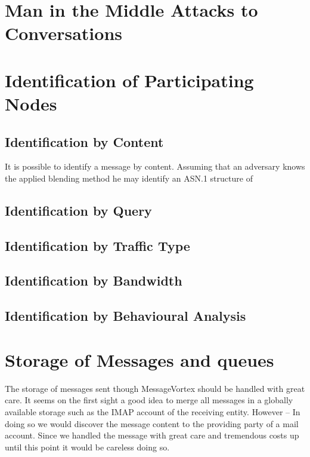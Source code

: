 \section{Man in the Middle Attacks to Conversations}


\section{Identification of Participating Nodes}


\subsection{Identification by Content}
It is possible to identify a message by content. Assuming that an adversary knows the applied blending method he may identify an ASN.1 structure of 


\subsection{Identification by Query}


\subsection{Identification by Traffic Type}


\subsection{Identification by Bandwidth}


\subsection{Identification by Behavioural Analysis}


\section{Storage of Messages and queues}
The storage of messages sent though MessageVortex should be handled with great care. It seems on the first sight a good idea to merge all messages in a globally available storage such as the IMAP account of the receiving entity. However -- In doing so we would discover the message content to the providing party of a mail account. Since we handled the message with great care and tremendous costs up until this point it would be careless doing so. 

